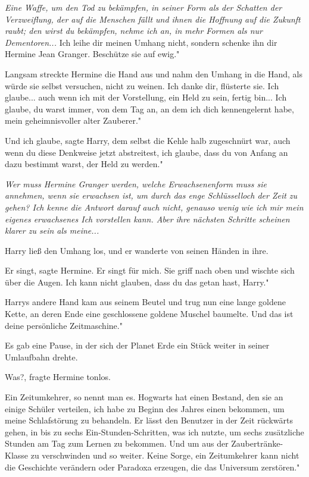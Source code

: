 \emph{Eine Waffe, um den Tod zu bekämpfen, in seiner Form als der Schatten der
Verzweiflung, der auf die Menschen fällt und ihnen die Hoffnung auf die Zukunft
raubt; den wirst du bekämpfen, nehme ich an, in mehr Formen als nur
Dementoren... } \glqq Ich leihe dir meinen Umhang nicht, sondern schenke ihn dir
Hermine Jean Granger. Beschütze sie auf ewig."

Langsam streckte Hermine die Hand aus und nahm den Umhang in die Hand, als würde
sie selbst versuchen, nicht zu weinen. \glqq Ich danke dir\grqq{}, flüsterte
sie. \glqq Ich glaube... auch wenn ich mit der Vorstellung, ein Held zu sein,
fertig bin... Ich glaube, du warst immer, von dem Tag an, an dem ich dich
kennengelernt habe, mein geheimnisvoller alter Zauberer."

\glqq Und ich glaube\grqq{}, sagte Harry, dem selbst die Kehle halb zugeschnürt
war, \glqq auch wenn du diese Denkweise jetzt abstreitest, ich glaube, dass du
von Anfang an dazu bestimmt warst, der Held zu werden."

\emph{Wer muss Hermine Granger werden, welche Erwachsenenform muss sie annehmen, wenn sie erwachsen ist, um durch das enge Schlüsselloch der Zeit zu gehen? Ich kenne die Antwort darauf auch nicht, genauso wenig wie ich mir mein eigenes erwachsenes Ich vorstellen kann. Aber ihre nächsten Schritte scheinen klarer zu sein als meine... }

Harry ließ den Umhang los, und er wanderte von seinen Händen in ihre.

\glqq Er singt\grqq{}, sagte Hermine. \glqq Er singt für mich.\grqq{} Sie griff
nach oben und wischte sich über die Augen. \glqq Ich kann nicht glauben, dass du
das getan hast, Harry."

Harrys andere Hand kam aus seinem Beutel und trug nun eine lange goldene Kette,
an deren Ende eine geschlossene goldene Muschel baumelte. \glqq Und das ist
deine persönliche Zeitmaschine."

Es gab eine Pause, in der sich der Planet Erde ein Stück weiter in seiner
Umlaufbahn drehte.

\glqq Was?\grqq{}, fragte Hermine tonlos.

\glqq Ein Zeitumkehrer, so nennt man es. Hogwarts hat einen Bestand, den sie an
einige Schüler verteilen, ich habe zu Beginn des Jahres einen bekommen, um meine
Schlafstörung zu behandeln. Er lässt den Benutzer in der Zeit rückwärts gehen,
in bis zu sechs Ein-Stunden-Schritten, was ich nutzte, um sechs zusätzliche
Stunden am Tag zum Lernen zu bekommen. Und um aus der Zaubertränke-Klasse zu
verschwinden und so weiter. Keine Sorge, ein Zeitumkehrer kann nicht die
Geschichte verändern oder Paradoxa erzeugen, die das Universum zerstören."

